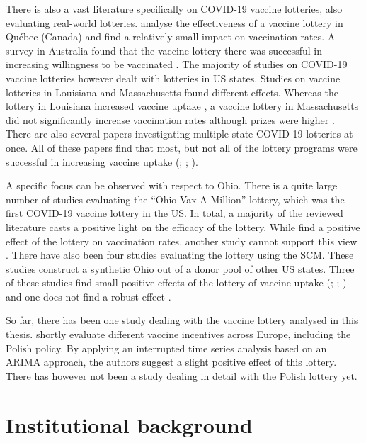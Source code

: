 \documentclass{scrbook}
\begin{document}
There is also a vast literature specifically on COVID-19 vaccine
lotteries, also evaluating real-world lotteries.
\textcite{dube_exploring_2022} analyse the effectiveness of a vaccine
lottery in Québec (Canada) and find a relatively small impact on
vaccination rates. A survey in Australia found that the vaccine lottery
there was successful in increasing willingness to be vaccinated
\parencite{jun_association_2022}. The majority of studies on COVID-19
vaccine lotteries however dealt with lotteries in US states. Studies on
vaccine lotteries in Louisiana and Massachusetts found different
effects. Whereas the lottery in Louisiana increased vaccine uptake
\parencite{wang_moving_2023}, a vaccine lottery in Massachusetts did not
significantly increase vaccination rates although prizes were higher
\parencite{kim_did_2023}. There are also several papers investigating
multiple state COVID-19 lotteries at once. All of these papers find that
most, but not all of the lottery programs were successful in increasing
vaccine uptake (\cite{robertson_are_2021};
\cite{acharya_implementation_2021}; \cite{fuller_assessing_2022}).

A specific focus can be observed with respect to Ohio. There is a quite
large number of studies evaluating the ``Ohio Vax-A-Million'' lottery,
which was the first COVID-19 vaccine lottery in the US. In total, a
majority of the reviewed literature casts a positive light on the
efficacy of the lottery. While \textcite{mallow_covid-19_2022} find a
positive effect of the lottery on vaccination rates, another study
cannot support this view \parencite{walkey_lottery-based_2021}. There
have also been four studies evaluating the lottery using the SCM. These
studies construct a synthetic Ohio out of a donor pool of other US
states. Three of these studies find small positive effects of the
lottery of vaccine uptake (\cite{brehm_ohio_2022};
\cite{barber_conditional_2022}; \cite{sehgal_impact_2021}) and one does
not find a robust effect \parencite{lang_did_2022}.

So far, there has been one study dealing with the vaccine lottery
analysed in this thesis. \textcite{kuznetsova_effectiveness_2022}
shortly evaluate different vaccine incentives across Europe, including
the Polish policy. By applying an interrupted time series analysis based
on an ARIMA approach, the authors suggest a slight positive effect of
this lottery. There has however not been a study dealing in detail with
the Polish lottery yet.

\section{Institutional background}
\end{document}

